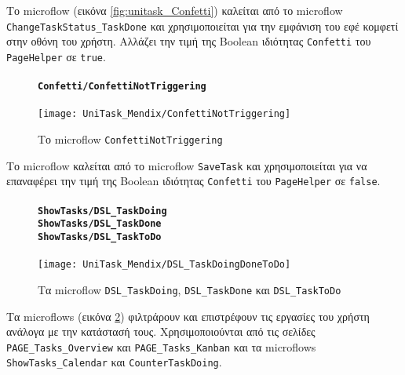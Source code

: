                 Το microflow (εικόνα \ref{fig:unitask_Confetti}) καλείται από το microflow \texttt{ChangeTaskStatus\_TaskDone} και χρησιμοποιείται για την εμφάνιση του εφέ κομφετί στην οθόνη του χρήστη. Αλλάζει την τιμή της Boolean ιδιότητας \texttt{Confetti} του \texttt{PageHelper} σε \texttt{true}.

                \begin{figure}[H] \noindent
                    \paragraph{\texttt{Confetti/ConfettiNotTriggering}}
                    \begin{center}
                        \texttt{[image: UniTask\_Mendix/ConfettiNotTriggering]}
                        \caption{\centering Το microflow \texttt{ConfettiNotTriggering}}
                        \label{fig:unitask_ConfettiNotTriggering}
                    \end{center}
                \end{figure}

                Το microflow καλείται από το microflow \texttt{SaveTask} και χρησιμοποιείται για να επαναφέρει την τιμή της Boolean ιδιότητας \texttt{Confetti} του \texttt{PageHelper} σε \texttt{false}.

                \newpage

                \begin{figure}[H] \noindent
                    \paragraph{\texttt{ShowTasks/DSL\_TaskDoing} \\ \texttt{ShowTasks/DSL\_TaskDone} \\ \texttt{ShowTasks/DSL\_TaskToDo}}
                    \begin{center}
                        \texttt{[image: UniTask\_Mendix/DSL\_TaskDoingDoneToDo]}
                        \caption{\centering Τα microflow \texttt{DSL\_TaskDoing}, \texttt{DSL\_TaskDone} και \texttt{DSL\_TaskToDo}}
                        \label{fig:unitask_DSLTaskDoingDoneToDo}
                    \end{center}
                \end{figure}

                Τα microflows (εικόνα \ref{fig:unitask_DSLTaskDoingDoneToDo}) φιλτράρουν και επιστρέφουν τις εργασίες του χρήστη ανάλογα με την κατάστασή τους. Χρησιμοποιούνται από τις σελίδες \texttt{PAGE\_Tasks\_Overview} και \texttt{PAGE\_Tasks\_Kanban} και τα microflows \texttt{ShowTasks\_Calendar} και \texttt{CounterTaskDoing}.

